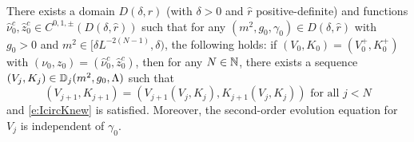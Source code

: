 \begin{theorem}
\label{thm:rhatflow}
There exists a domain $D(\delta, \hat r)$ (with $\delta > 0$ and $\hat r$
positive-definite) and functions $\hat\nu_0^c, \hat z_0^c \in C^{0,1,\pm}(D(\delta, \hat r))$
such that for any $(m^2, g_0, \gamma_0) \in D(\delta, \hat r)$
with $g_0 > 0$ and $m^2 \in [\delta L^{-2 (N - 1)}, \delta)$, the following holds:
if $(V_0, K_0) = (V^+_0, K^+_0)$ with $(\nu_0, z_0) = (\hat\nu_0^c, \hat z_0^c)$,
then for any $N \in {\mathbb N}$,
there exists a sequence $(V_j, K_j) \in \mathbb{D}_j(m^2, g_0, \Lambda)$ such that
\begin{equation}
	\label{e:VjKjDj-hat}
	(V_{j+1},K_{j+1}) = (V_{j+1}(V_j, K_j), K_{j+1}(V_j, K_j)) \text{ for all } j < N
\end{equation}
and \eqref{e:IcircKnew} is satisfied.
Moreover, the second-order evolution equation for $V_j$ is independent of $\gamma_0$.
\end{theorem}